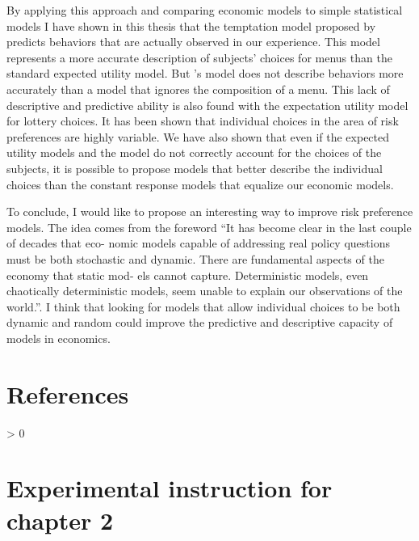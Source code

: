 \documentclass[
]{book}
\newlength{\cslhangindent}
\newenvironment{CSLReferences}[2] %
 {%
  \setlength{\parindent}{0pt}
  \ifodd #1 \everypar{\setlength{\hangindent}{\cslhangindent}}\ignorespaces\fi
  \ifnum #2 > 0
  \setlength{\parskip}{#2\baselineskip}
  \fi
 }%
 {}
\begin{document}
By applying this approach and comparing economic models to simple statistical
models I have shown in this thesis that the temptation model proposed by
\citet{gul2001temptation} predicts behaviors that are actually observed in our
experience.
This model represents a more accurate description of subjects' choices for menus
than the standard expected utility model.
But \citet{gul2001temptation}'s model does not describe behaviors more accurately than
a model that ignores the composition of a menu.
This lack of descriptive and predictive ability is also found with the
expectation utility model for lottery choices.
It has been shown that individual choices in the area of risk preferences are
highly variable.
We have also shown that even if the expected utility models and the
\citet{gul2001temptation} model do not correctly account for the choices of the
subjects, it is possible to propose models that better describe the individual
choices than the constant response models that equalize our economic models.

To conclude, I would like to propose an interesting way to improve risk
preference models.
The idea comes from the foreword \citet{aliprantis2006hitchhiker}
``It has become clear in the last couple of decades that eco-
nomic models capable of addressing real policy questions must be both stochastic
and dynamic. There are fundamental aspects of the economy that static mod-
els cannot capture. Deterministic models, even chaotically deterministic models,
seem unable to explain our observations of the world.''.
I think that looking for models that allow individual choices to be both dynamic
and random could improve the predictive and descriptive capacity of models in
economics.

\hypertarget{references}{%
\chapter*{References}\label{references}}

\hypertarget{refs}{}
\begin{CSLReferences}{0}{0}
\end{CSLReferences}

\hypertarget{appendix-appendix}{%
\appendix}


\hypertarget{experimental-instruction-for-chapter-2}{%
\chapter{Experimental instruction for chapter 2}\label{experimental-instruction-for-chapter-2}}
\end{document}
